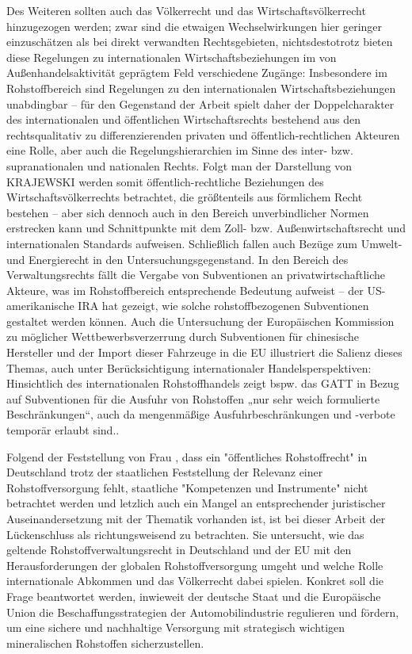 \documentclass[12pt,a4paper,oneside]{book} %
\begin{document}
	Des Weiteren sollten auch das Völkerrecht und das Wirtschaftsvölkerrecht hinzugezogen werden; zwar sind die etwaigen Wechselwirkungen hier geringer einzuschätzen als bei direkt verwandten Rechtsgebieten, nichtsdestotrotz bieten diese Regelungen zu internationalen Wirtschaftsbeziehungen im von Außenhandelsaktivität geprägtem Feld verschiedene Zugänge: Insbesondere im Rohstoffbereich sind Regelungen zu den internationalen Wirtschaftsbeziehungen unabdingbar – für den Gegenstand der Arbeit spielt daher der Doppelcharakter des internationalen und öffentlichen Wirtschaftsrechts bestehend aus den rechtsqualitativ zu differenzierenden privaten und öffentlich-rechtlichen Akteuren \autocite[1, 1]{herdegen_internationales_2020} eine Rolle, aber auch die Regelungshierarchien im Sinne des inter- bzw. supranationalen und nationalen Rechts. Folgt man der Darstellung von KRAJEWSKI \autocite[10]{krajewski_wirtschaftsvolkerrecht_2021} werden somit öffentlich-rechtliche Beziehungen des Wirtschaftsvölkerrechts betrachtet, die größtenteils aus förmlichem Recht bestehen – aber sich dennoch auch in den Bereich unverbindlicher Normen erstrecken kann und Schnittpunkte mit dem Zoll- bzw. Außenwirtschaftsrecht und internationalen Standards aufweisen. Schließlich fallen auch Bezüge zum Umwelt- und Energierecht in den Untersuchungsgegenstand. In den Bereich des Verwaltungsrechts fällt die Vergabe von Subventionen an privatwirtschaftliche Akteure, was im Rohstoffbereich entsprechende Bedeutung aufweist – der US-amerikanische IRA hat gezeigt,\autocite[s. insbesondere bzgl. der dt. Automobilindustrie]{book_amerikaner_2023}  wie solche rohstoffbezogenen Subventionen gestaltet werden können. Auch die Untersuchung der Europäischen Kommission zu möglicher Wettbewerbsverzerrung durch Subventionen für chinesische Hersteller und der Import dieser Fahrzeuge in die EU illustriert die Salienz dieses Themas, auch unter Berücksichtigung internationaler Handelsperspektiven: Hinsichtlich des internationalen Rohstoffhandels zeigt bspw. das GATT in Bezug auf Subventionen für die Ausfuhr von Rohstoffen „nur sehr weich formulierte Beschränkungen“, auch da mengenmäßige Ausfuhrbeschränkungen und -verbote temporär erlaubt sind.\autocite[11, 2]{herdegen_internationales_2020}.
	
	Folgend der Feststellung von Frau \autocite[4]{frau2023}, dass ein "öffentliches Rohstoffrecht" in Deutschland trotz der staatlichen Feststellung der Relevanz einer Rohstoffversorgung fehlt, staatliche "Kompetenzen und Instrumente" nicht betrachtet werden und letzlich auch ein Mangel an entsprechender juristischer Auseinandersetzung mit der Thematik \autocite[5]{frau} vorhanden ist, ist bei dieser Arbeit der Lückenschluss als richtungsweisend zu betrachten. Sie untersucht, wie das geltende Rohstoffverwaltungsrecht in Deutschland und der EU mit den Herausforderungen der globalen Rohstoffversorgung umgeht und welche Rolle internationale Abkommen und das Völkerrecht dabei spielen. Konkret soll die Frage beantwortet werden, inwieweit der deutsche Staat und die Europäische Union die Beschaffungsstrategien der Automobilindustrie regulieren und fördern, um eine sichere und nachhaltige Versorgung mit strategisch wichtigen mineralischen Rohstoffen sicherzustellen.
	
\end{document}
